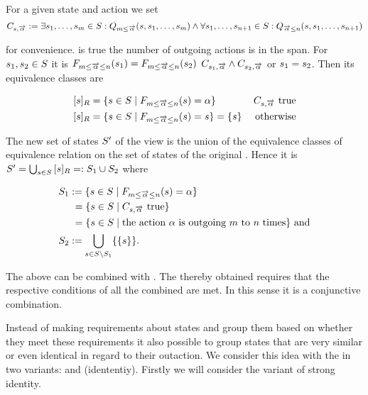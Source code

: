 \documentclass[preview]{standalone}
\begin{document}
For a given state \state and action \action we set
\[
\formoutact:= \exists \state_1, \dots, \state_\numoutactb \in \states: \predminoutact[\numoutactb]\land \\
\forall \state_1, \dots, \state_{\numoutact+1} \in \states: \predmaxoutact
\]

for convenience. \formoutact is true  \iffN the number of outgoing actions is in the span. For $\state_1, \state_2 \in \states$ it is $\gfctspanoutaction(\state_1) = \gfctspanoutaction(\state_2)$ \iffN $\formoutact[\state_1] \land \formoutact[\state_2]$ or $\state_1 = \state_2$. Then its equivalence classes are

\begin{align*}
	\eqclassv &= \{\state \in \states \mid \gfctspanoutaction(\state) = \action\} &\formoutact \text{ true} \\
	\eqclassv &= \{\state \in \states \mid \gfctspanoutaction(\state) = \state\} = \{\state\} &\text{ otherwise}	
\end{align*}

The new set of states $\states'$ of the view \viewspanoutaction is the union of the equivalence classes of equivalence relation \eqrelview on the set of states \states of the original \chosengraphtypeN. Hence it is $\states' = \bigcup_{\state \in \states} \eqclassv =: \states_1 \cup \states_2$ where

\begin{align*}
	\states_1 &:= \{\state \in \states \mid \gfctspanoutaction(\state) = \action\} \\
	&\hspace{1.15mm}= \{\state \in \states  \mid \formoutact \text{ true}\} \\
	&\hspace{1.15mm}= \{\state \in \states \mid \text{the action } \action \text{ is outgoing } \numoutactb \text{ to } \numoutact \text{ times}\} \text{ and} \\
	\states_2 &:= \remstates.
\end{align*}

The \viewsN above can be combined with \parllcompN. The thereby obtained \viewN requires that the respective conditions of all the combined \viewsN are met. In this sense it is a conjunctive combination.

Instead of making requirements about states and group them based on whether they meet these requirements it also possible to group states that are very similar or even identical in regard to their outaction. We consider this idea with the \emph{\outactident \viewNC} in two variants: \outactidentstrong and \outactidentweak (idententiy). Firstly we will consider the variant of strong identity.
\end{document}
